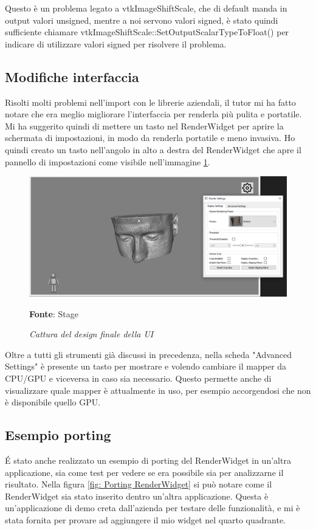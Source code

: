 Questo è un problema legato a vtkImageShiftScale, che di default manda in output valori unsigned, mentre a noi servono valori signed, è stato quindi sufficiente chiamare vtkImageShiftScale::SetOutputScalarTypeToFloat() per indicare di utilizzare valori signed per risolvere il problema.

\subsection{Modifiche interfaccia}
Risolti molti problemi nell'import con le librerie aziendali, il tutor mi ha fatto notare che era meglio migliorare l'interfaccia per renderla più pulita e portatile. Mi ha suggerito quindi di mettere un tasto nel RenderWidget per aprire la schermata di impostazioni, in modo da renderla portatile e meno invasiva. Ho quindi creato un tasto nell'angolo in alto a destra del RenderWidget che apre il pannello di impostazioni come visibile nell'immagine \ref{fig: Final UI}.

\begin{figure}[h]
    \centering
    \includegraphics[width=1\textwidth]{immagini/svolgimento/finalnewui.png}
    \caption{\textit{Cattura del design finale della UI}}
    \textbf{Fonte}: Stage
    \label{fig: Final UI}
\end{figure}

Oltre a tutti gli strumenti già discussi in precedenza, nella scheda "Advanced Settings" è presente un tasto per mostrare e volendo cambiare il mapper da CPU/GPU e viceversa in caso sia necessario. Questo permette anche di visualizzare quale mapper è attualmente in uso, per esempio accorgendosi che non è disponibile quello GPU.

\subsection{Esempio porting}
\'E stato anche realizzato un esempio di porting del RenderWidget in un'altra applicazione, sia come test per vedere se era possibile sia per analizzarne il risultato. Nella figura \ref{fig: Porting RenderWidget} si può notare come il RenderWidget sia stato inserito dentro un'altra applicazione. Questa è un'applicazione di demo creta dall'azienda per testare delle funzionalità, e mi è stata fornita per provare ad aggiungere il mio widget nel quarto quadrante.

